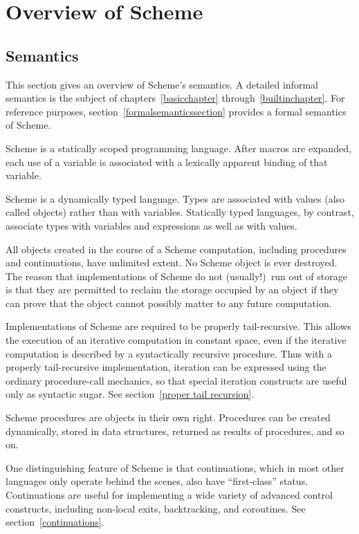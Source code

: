 
\chapter{Overview of Scheme}

\section{Semantics}
\label{semanticsection}

This section gives an overview of Scheme's semantics.  A
detailed informal semantics is the subject of
chapters~\ref{basicchapter} through~\ref{builtinchapter}.  For reference
purposes, section~\ref{formalsemanticssection} provides a formal
semantics of Scheme.

\vest Scheme is a statically scoped programming
language.  After macros are expanded, each use of a variable is associated
with a lexically apparent binding of that variable.

\vest Scheme is a dynamically typed language.  Types
are associated with values (also called objects) rather than
with variables.  
Statically typed languages, by contrast, associate types with
variables and expressions as well as with values.

\vest All objects created in the course of a Scheme computation, including
procedures and continuations, have unlimited extent.
No Scheme object is ever destroyed.  The reason that
implementations of Scheme do not (usually!)\ run out of storage is that
they are permitted to reclaim the storage occupied by an object if
they can prove that the object cannot possibly matter to any future
computation.  

\vest Implementations of Scheme are required to be properly tail-recursive.
This allows the execution of an iterative computation in constant space,
even if the iterative computation is described by a syntactically
recursive procedure.  Thus with a properly tail-recursive implementation,
iteration can be expressed using the ordinary procedure-call
mechanics, so that special iteration constructs are useful only as
syntactic sugar.  See section~\ref{proper tail recursion}.

\vest Scheme procedures are objects in their own right.  Procedures can be
created dynamically, stored in data structures, returned as results of
procedures, and so on.  

\vest One distinguishing feature of Scheme is that continuations, which
in most other languages only operate behind the scenes, also have
``first-class'' status.  Continuations are useful for implementing a
wide variety of advanced control constructs, including non-local exits,
backtracking, and coroutines.  See section~\ref{continuations}.

